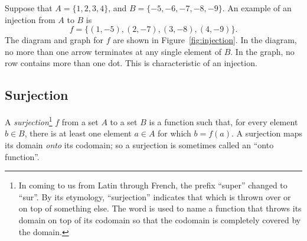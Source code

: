\noindent Suppose that $A = \{1, 2, 3, 4\}$, and $B = \{-5, -6, -7, -8, -9\}$.
An example of an injection from $A$ to $B$ is
\begin{equation*}
   f = \{(1,-5), (2,-7), (3,-8), (4,-9)\}.
\end{equation*}
The diagram and graph for $f$ are shown in Figure~\ref{fig:injection}.  In the
diagram, no more than one arrow terminates at any single element of $B$.  In
the graph, no row contains more than one dot.  This is characteristic of an
injection.

\subsection{Surjection}

\begin{definition}
   A \emph{surjection}\footnote{%
      In coming to us from Latin through French, the prefix ``super'' changed
      to ``sur''. By its etymology, ``surjection'' indicates that which is
      thrown over or on top of something else. The word is used to name a
      function that throws its domain on top of its codomain so that the
      codomain is completely covered by the domain.
   }
   $f$ from a set $A$ to a set $B$ is a function such that, for every element
   $b \in B$, there is at least one element $a \in A$ for which $b = f(a)$. A
   surjection maps its domain \emph{onto} its codomain; so a surjection is
   sometimes called an ``onto function''.
\end{definition}

